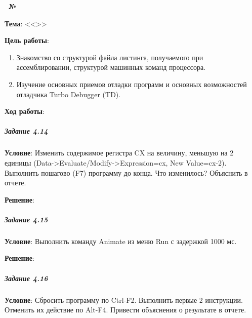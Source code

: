 \begin{center}
   \textbf{\titlePageWorkType~№\titlePageWorkNumber~\titlePageWorkPart}
\end{center}

\textbf{Тема}: <<\titlePageTopic>>

\textbf{Цель работы}: 

\begin{enumerate}
   \item Знакомство со структурой файла листинга, получаемого при ассемблировании, структурой машинных команд процессора.
   \item Изучение основных приемов отладки программ и основных возможностей отладчика Turbo Debugger (TD).
\end{enumerate}

\begin{center}
   \textbf{Ход работы}:
\end{center}
















\subparagraph{Задание 4.14}

\textbf{Условие}:
Изменить содержимое регистра CX на величину, меньшую на 2 единицы (Data->Evaluate/Modify->Expression=cx, New Value=cx-2). Выполнить пошагово (F7) программу до конца. Что изменилось? Объяснить в отчете.

\textbf{Решение}:



\subparagraph{Задание 4.15}

\textbf{Условие}:
Выполнить команду Animate из меню Run с задержкой 1000 мс.

\textbf{Решение}:



\subparagraph{Задание 4.16}

\textbf{Условие}:
Сбросить программу по Ctrl-F2. Выполнить первые 2 инструкции. Отменить их действие по Alt-F4. Привести объяснения о результате в отчете.

